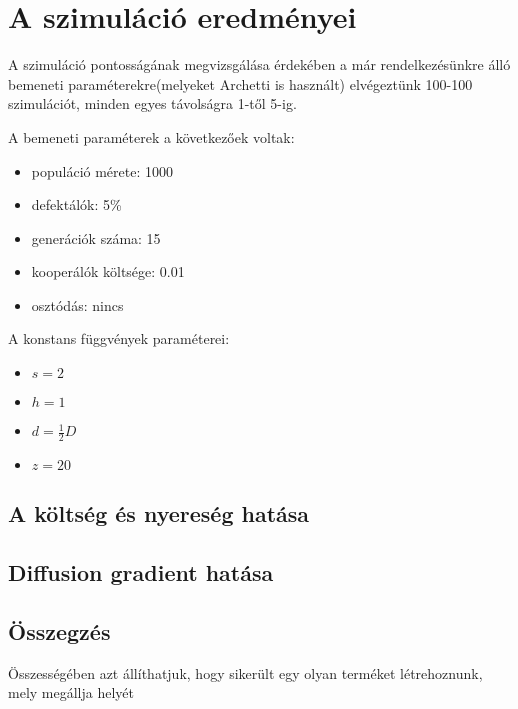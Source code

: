 \section{A szimuláció eredményei}

A szimuláció pontosságának megvizsgálása érdekében a már rendelkezésünkre álló bemeneti paraméterekre(melyeket Archetti is használt\cite{archetti2013evolutionary}) elvégeztünk 100-100 szimulációt, minden egyes távolságra 1-től 5-ig.

\begin{multicols}{2}
	A bemeneti paraméterek a következőek voltak:
	\begin{itemize}[noitemsep]
		\item populáció mérete: 1000
		\item defektálók: 5\%
		\item generációk száma: 15
		\item kooperálók költsége: 0.01
		\item osztódás: nincs
	\end{itemize}
	A konstans függvények paraméterei:
	\begin{itemize}[noitemsep]
		\item $s = 2$
		\item $h = 1$
		\item $d = \frac{1}{2}D$
		\item $z = 20$
	\end{itemize}	
\end{multicols}

\subsection{A költség és nyereség hatása}
\subsection{Diffusion gradient hatása}
\subsection{Összegzés}

Összességében azt állíthatjuk, hogy sikerült egy olyan terméket létrehoznunk, mely megállja helyét
